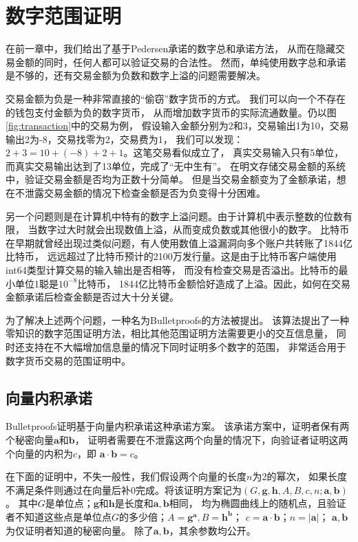 \chapter{数字范围证明}\label{chap:bulletproof}

在前一章中，我们给出了基于Pedersen承诺的数字总和承诺方法，
从而在隐藏交易金额的同时，任何人都可以验证交易的合法性。
然而，单纯使用数字总和承诺是不够的，还有交易金额为负数和数字上溢的问题需要解决。

交易金额为负是一种非常直接的``偷窃''数字货币的方式。
我们可以向一个不存在的钱包支付金额为负的数字货币，
从而增加数字货币的实际流通数量。仍以图\ref{fig:transaction}中的交易为例，
假设输入金额分别为2和3，交易输出1为10，交易输出2为-8，交易找零为2，交易费为1，
我们可以发现：$2+3=10+(-8)+2+1$。这笔交易看似成立了，
真实交易输入只有5单位，而真实交易输出达到了13单位，完成了``无中生有''。
在明文存储交易金额的系统中，验证交易金额是否均为正数十分简单。
但是当交易金额变为了金额承诺，想在不泄露交易金额的情况下检查金额是否为负变得十分困难。

另一个问题则是在计算机中特有的数字上溢问题。由于计算机中表示整数的位数有限，
当数字过大时就会出现数值上溢，从而变成负数或其他很小的数字。
比特币在早期就曾经出现过类似问题，有人使用数值上溢漏洞向多个账户共转账了1844亿比特币\cite{btcoverflow}，
远远超过了比特币预计的2100万发行量。这是由于比特币客户端使用int64类型计算交易的输入输出是否相等，
而没有检查交易是否溢出。比特币的最小单位1聪是$10^{-8}$比特币，
1844亿比特币金额恰好造成了上溢。因此，如何在交易金额承诺后检查金额是否过大十分关键。

为了解决上述两个问题，一种名为Bulletproofs的方法被提出\cite{bunz2018bulletproofs}。
该算法提出了一种零知识的数字范围证明方法，相比其他范围证明方法需要更小的交互信息量，
同时还支持在不大幅增加信息量的情况下同时证明多个数字的范围，
非常适合用于数字货币交易的范围证明中。

\section{向量内积承诺}

Bulletproofs证明基于向量内积承诺\cite{bootle2016efficient}这种承诺方案。
该承诺方案中，证明者保有两个秘密向量$\boldsymbol{a}$和$\boldsymbol{b}$，
证明者需要在不泄露这两个向量的情况下，向验证者证明这两个向量的内积为$c$，即
$\boldsymbol{a}\cdot\boldsymbol{b}=c$。

在下面的证明中，不失一般性，我们假设两个向量的长度$n$为2的幂次，
如果长度不满足条件则通过在向量后补0完成。将该证明方案记为$(G,\boldsymbol{g},\boldsymbol{h},A,B,c,n;\boldsymbol{a},\boldsymbol{b})$。
其中$G$是单位点；$\boldsymbol{g}$和$\boldsymbol{h}$是长度和$\boldsymbol{a},\boldsymbol{b}$相同，
均为椭圆曲线上的随机点，且验证者不知道这些点是单位点$G$的多少倍；$A=\boldsymbol{g}^{\boldsymbol{a}}, B=\boldsymbol{h}^{\boldsymbol{b}}$；
$c=\boldsymbol{a}\cdot\boldsymbol{b}$；$n=|\boldsymbol{a}|$；
$\boldsymbol{a},\boldsymbol{b}$为仅证明者知道的秘密向量。
除了$\boldsymbol{a},\boldsymbol{b}$，其余参数均公开。

